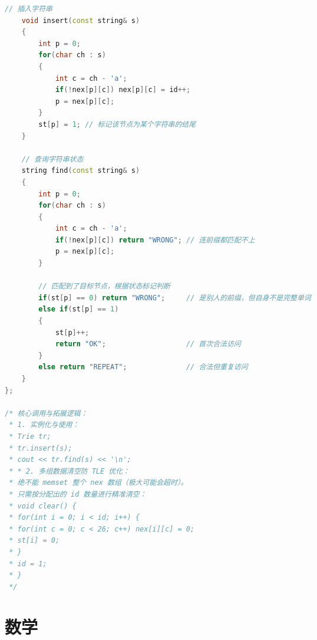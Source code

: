\documentclass[10pt,landscape,a4paper]{article}
\begin{document}
\begin{multicols*}{3}
\begin{lstlisting}[language=C++]
    // 插入字符串
    void insert(const string& s)
    {
        int p = 0;
        for(char ch : s)
        {
            int c = ch - 'a';
            if(!nex[p][c]) nex[p][c] = id++;
            p = nex[p][c];
        }
        st[p] = 1; // 标记该节点为某个字符串的结尾
    }

    // 查询字符串状态
    string find(const string& s)
    {
        int p = 0;
        for(char ch : s)
        {
            int c = ch - 'a';
            if(!nex[p][c]) return "WRONG"; // 连前缀都匹配不上
            p = nex[p][c];
        }
        
        // 匹配到了目标节点，根据状态标记判断
        if(st[p] == 0) return "WRONG";     // 是别人的前缀，但自身不是完整单词
        else if(st[p] == 1) 
        { 
            st[p]++; 
            return "OK";                   // 首次合法访问
        }
        else return "REPEAT";              // 合法但重复访问
    }
};

/* 核心调用与拓展逻辑：
 * 1. 实例化与使用：
 * Trie tr;
 * tr.insert(s);
 * cout << tr.find(s) << '\n';
 * * 2. 多组数据清空防 TLE 优化：
 * 绝不能 memset 整个 nex 数组（极大可能会超时）。
 * 只需按分配出的 id 数量进行精准清空：
 * void clear() {
 * for(int i = 0; i < id; i++) {
 * for(int c = 0; c < 26; c++) nex[i][c] = 0;
 * st[i] = 0;
 * }
 * id = 1;
 * }
 */
\end{lstlisting}
\section*{数学}

\end{multicols*}
\end{document}
